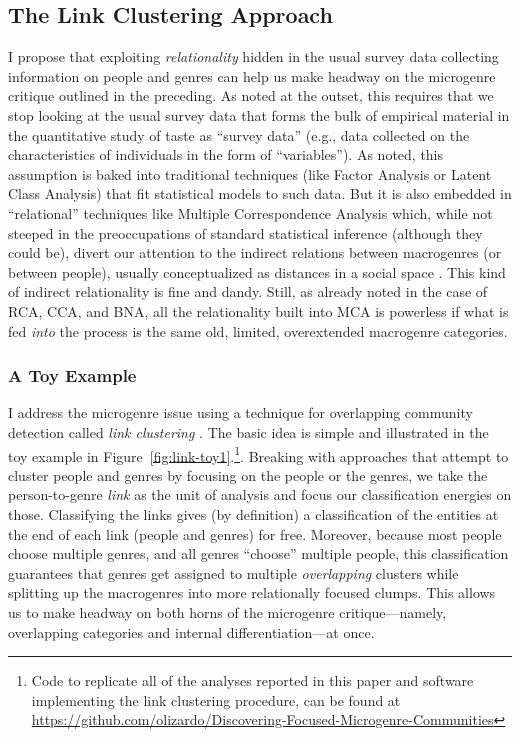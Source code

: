 \documentclass[a4paper,12pt]{extarticle}
\begin{document}
\subsection{The Link Clustering Approach}
I propose that exploiting {\em relationality} hidden in the usual survey data collecting information on people and genres can help us make headway on the microgenre critique outlined in the preceding. As noted at the outset, this requires that we stop looking at the usual survey data that forms the bulk of empirical material in the quantitative study of taste as ``survey data'' (e.g., data collected on the characteristics of individuals in the form of ``variables''). As noted, this assumption is baked into traditional techniques (like Factor Analysis or Latent Class Analysis) that fit statistical models to such data. But it is also embedded in ``relational'' techniques like Multiple Correspondence Analysis which, while not steeped in the preoccupations of standard statistical inference (although they could be), divert our attention to the indirect relations between macrogenres (or between people), usually conceptualized as distances in a social space \citep{flemmen_etal18}. This kind of indirect relationality is fine and dandy. Still, as already noted in the case of RCA, CCA, and BNA, all the relationality built into MCA is powerless if what is fed {\em into} the process is the same old, limited, overextended macrogenre categories. 

\subsubsection{A Toy Example}
I address the microgenre issue using a technique for overlapping community detection called \textit{link clustering} \citep{ahn_etal10}. The basic idea is simple and illustrated in the toy example in Figure~\ref{fig:link-toy1}.\footnote{Code to replicate all of the analyses reported in this paper and software implementing the link clustering procedure, can be found at \url{https://github.com/olizardo/Discovering-Focused-Microgenre-Communities}}. Breaking with approaches that attempt to cluster people and genres by focusing on the people or the genres, we take the person-to-genre {\em link} as the unit of analysis and focus our classification energies on those. Classifying the links gives (by definition) a classification of the entities at the end of each link (people and genres) for free. Moreover, because most people choose multiple genres, and all genres ``choose'' multiple people, this classification guarantees that genres get assigned to multiple \textit{overlapping} clusters while splitting up the macrogenres into more relationally focused clumps. This allows us to make headway on both horns of the microgenre critique---namely, overlapping categories and internal differentiation---at once.
\end{document}
